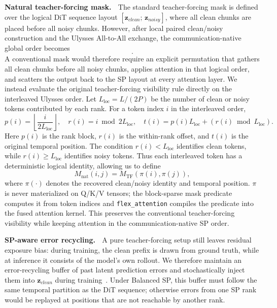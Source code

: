 \textbf{Natural teacher-forcing mask.} $\;$
The standard teacher-forcing mask is defined over the logical DiT sequence layout $[\mathbf{z}_{clean};\,\mathbf{z}_{noisy}]$, where all clean chunks are placed before all noisy chunks.
However, after local paired clean/noisy construction and the Ulysses All-to-All exchange, the communication-native global order becomes
\begin{equation}
    [\mathbf{z}_{clean}^{(0)},\mathbf{z}_{noisy}^{(0)},\ldots,
    \mathbf{z}_{clean}^{(P-1)},\mathbf{z}_{noisy}^{(P-1)}].
\end{equation}
A conventional mask would therefore require an explicit permutation that gathers all clean chunks before all noisy chunks, applies attention in that logical order, and scatters the output back to the SP layout at every attention layer.
We instead evaluate the original teacher-forcing visibility rule directly on the interleaved Ulysses order.
Let $L_{\mathrm{loc}}=L/(2P)$ be the number of clean or noisy tokens contributed by each rank.
For a token index $i$ in the interleaved order,
\begin{equation}
    p(i)=\left\lfloor \frac{i}{2L_{\mathrm{loc}}} \right\rfloor,\quad
    r(i)=i\bmod 2L_{\mathrm{loc}},\quad
    t(i)=p(i)L_{\mathrm{loc}} + (r(i)\bmod L_{\mathrm{loc}}).
\end{equation}
Here $p(i)$ is the rank block, $r(i)$ is the within-rank offset, and $t(i)$ is the original temporal position.
The condition $r(i)<L_{\mathrm{loc}}$ identifies clean tokens, while $r(i)\ge L_{\mathrm{loc}}$ identifies noisy tokens.
Thus each interleaved token has a deterministic logical identity, allowing us to define
\begin{equation}
    M_{\mathrm{nat}}(i,j)=M_{\mathrm{TF}}(\pi(i),\pi(j)),
\end{equation}
where $\pi(\cdot)$ denotes the recovered clean/noisy identity and temporal position.
$\pi$ is never materialized on Q/K/V tensors; the block-sparse mask predicate computes it from token indices and \texttt{flex\_attention} compiles the predicate into the fused attention kernel.
This preserves the conventional teacher-forcing visibility while keeping attention in the communication-native SP order.

\textbf{SP-aware error recycling.} $\;$
A pure teacher-forcing setup still leaves residual exposure bias: during training, the clean prefix is drawn from ground truth, while at inference it consists of the model's own rollout.
We therefore maintain an error-recycling buffer of past latent prediction errors and stochastically inject them into $\mathbf{z}_{clean}$ during training~\cite{li2025stable}.
Under Balanced SP, this buffer must follow the same temporal partition as the DiT sequence; otherwise errors from one SP rank would be replayed at positions that are not reachable by another rank.

